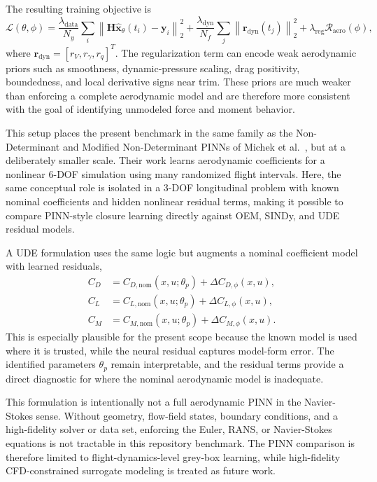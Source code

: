 \documentclass[11pt]{article}
\begin{document}
The resulting training objective is
\[
\mathcal{L}(\theta,\phi)=
\frac{\lambda_{\mathrm{data}}}{N_y}\sum_i
\left\|\mathbf{H}\widehat{\mathbf{x}}_\theta(t_i)-\mathbf{y}_i\right\|_2^2
+\frac{\lambda_{\mathrm{dyn}}}{N_f}\sum_j
\left\|\mathbf{r}_{\mathrm{dyn}}(t_j)\right\|_2^2
+\lambda_{\mathrm{reg}}\mathcal{R}_{\mathrm{aero}}(\phi),
\]
where $\mathbf{r}_{\mathrm{dyn}}=[r_V,r_\gamma,r_q]^T$. The regularization term can encode weak aerodynamic priors such as smoothness, dynamic-pressure scaling, drag positivity, boundedness, and local derivative signs near trim. These priors are much weaker than enforcing a complete aerodynamic model and are therefore more consistent with the goal of identifying unmodeled force and moment behavior.

This setup places the present benchmark in the same family as the Non-Determinant and Modified Non-Determinant PINNs of Michek et al.~\citep{michek2026flight}, but at a deliberately smaller scale. Their work learns aerodynamic coefficients for a nonlinear 6-DOF simulation using many randomized flight intervals. Here, the same conceptual role is isolated in a 3-DOF longitudinal problem with known nominal coefficients and hidden nonlinear residual terms, making it possible to compare PINN-style closure learning directly against OEM, SINDy, and UDE residual models.

A UDE formulation uses the same logic but augments a nominal coefficient model with learned residuals,
\[
\begin{aligned}
C_D &= C_{D,\mathrm{nom}}(x,u;\theta_p)+\Delta C_{D,\phi}(x,u),\\
C_L &= C_{L,\mathrm{nom}}(x,u;\theta_p)+\Delta C_{L,\phi}(x,u),\\
C_M &= C_{M,\mathrm{nom}}(x,u;\theta_p)+\Delta C_{M,\phi}(x,u).
\end{aligned}
\]
This is especially plausible for the present scope because the known model is used where it is trusted, while the neural residual captures model-form error. The identified parameters $\theta_p$ remain interpretable, and the residual terms provide a direct diagnostic for where the nominal aerodynamic model is inadequate.

This formulation is intentionally not a full aerodynamic PINN in the Navier-Stokes sense. Without geometry, flow-field states, boundary conditions, and a high-fidelity solver or data set, enforcing the Euler, RANS, or Navier-Stokes equations is not tractable in this repository benchmark. The PINN comparison is therefore limited to flight-dynamics-level grey-box learning, while high-fidelity CFD-constrained surrogate modeling is treated as future work.
\end{document}
